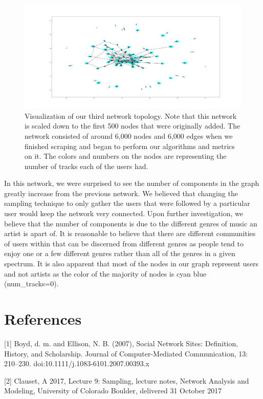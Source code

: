 \documentclass{article}
\begin{document}
\begin{figure}[h]
	\centering
	\includegraphics[scale=0.29]{take_3_visualization}
	\caption{Visualization of our third network topology.  Note that this network is scaled down to the first 500 nodes that were originally added.  The network consisted of around 6,000 nodes and 6,000 edges when we finished scraping and began to perform our algorithms and metrics on it.  The colors and numbers on the nodes are representing the number of tracks each of the users had.}
\end{figure}

In this network, we were surprised to see the number of components in the graph greatly increase from the previous network.  We believed that changing the sampling technique to only gather the users that were followed by a particular user would keep the network very connected.  Upon further investigation, we believe that the number of components is due to the different genres of music an artist is apart of.  It is reasonable to believe that there are different communities of users within that can be discerned from different genres as people tend to enjoy one or a few different genres rather than all of the genres in a given spectrum.  It is also apparent that most of the nodes in our graph represent users and not artists as the color of the majority of nodes is cyan blue (num\_tracks=0).

\section*{References}
\small

[1] Boyd, d. m. and Ellison, N. B. (2007), Social Network Sites: Definition, History, and Scholarship. Journal of Computer-Mediated Communication, 13: 210–230. doi:10.1111/j.1083-6101.2007.00393.x

[2] Clauset, A 2017, Lecture 9: Sampling, lecture notes, Network Analysis and Modeling, University of Colorado Boulder, delivered 31 October 2017
\end{document}
